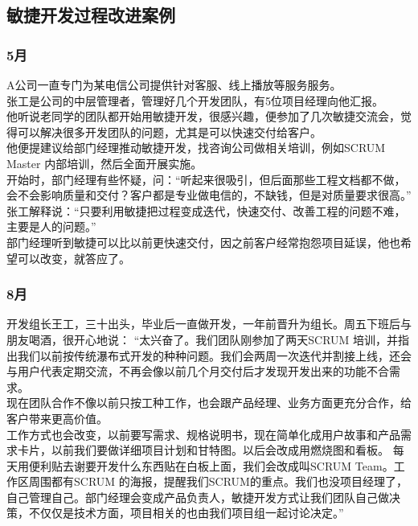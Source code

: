 \documentclass[]{article}
\date{}
\begin{document}
\hypertarget{ux654fux6377ux5f00ux53d1ux8fc7ux7a0bux6539ux8fdbux6848ux4f8b}{%
\subsection{敏捷开发过程改进案例}\label{ux654fux6377ux5f00ux53d1ux8fc7ux7a0bux6539ux8fdbux6848ux4f8b}}

\hypertarget{ux6708}{%
\subsubsection{5月}\label{ux6708}}

A公司一直专门为某电信公司提供针对客服、线上播放等服务服务。\\
张工是公司的中层管理者，管理好几个开发团队，有5位项目经理向他汇报。\\
他听说老同学的团队都开始用敏捷开发，很感兴趣，便参加了几次敏捷交流会，觉得可以解决很多开发团队的问题，尤其是可以快速交付给客户。\\
他便提建议给部门经理推动敏捷开发，找咨询公司做相关培训，例如SCRUM Master
内部培训，然后全面开展实施。\\
开始时，部门经理有些怀疑，问：``听起来很吸引，但后面那些工程文档都不做，会不会影响质量和交付？客户都是专业做电信的，不缺钱，但是对质量要求很高。''\\
张工解释说：``只要利用敏捷把过程变成迭代，快速交付、改善工程的问题不难，主要是人的问题。''\\
部门经理听到敏捷可以比以前更快速交付，因之前客户经常抱怨项目延误，他也希望可以改变，就答应了。

\hypertarget{ux6708-1}{%
\subsubsection{8月}\label{ux6708-1}}

开发组长王工，三十出头，毕业后一直做开发，一年前晋升为组长。周五下班后与朋友喝酒，很开心地说：
``太兴奋了。我们团队刚参加了两天SCRUM
培训，并指出我们以前按传统瀑布式开发的种种问题。我们会两周一次迭代并割接上线，还会与用户代表定期交流，不再会像以前几个月交付后才发现开发出来的功能不合需求。\\
现在团队合作不像以前只按工种工作，也会跟产品经理、业务方面更充分合作，给客户带来更高价值。\\
工作方式也会改变，以前要写需求、规格说明书，现在简单化成用户故事和产品需求卡片，以前我们要做详细项目计划和甘特图。以后会改成用燃烧图和看板。
每天用便利贴去谢要开发什么东西贴在白板上面，我们会改成叫SCRUM
Team。工作区周围都有SCRUM
的海报，提醒我们SCRUM的重点。我们也没项目经理了，自己管理自己。部门经理会变成产品负责人，敏捷开发方式让我们团队自己做决策，不仅仅是技术方面，项目相关的也由我们项目组一起讨论决定。''\\
\end{document}
